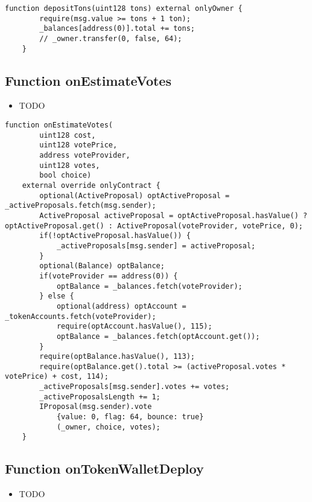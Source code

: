 \begin{lstlisting}[firstnumber=204]
    function depositTons(uint128 tons) external onlyOwner {
        require(msg.value >= tons + 1 ton);
        _balances[address(0)].total += tons;
        // _owner.transfer(0, false, 64);
    }
\end{lstlisting}

\subsection{Function onEstimateVotes}

\begin{itemize}
\item TODO
\end{itemize}

\begin{lstlisting}[firstnumber=60]
    function onEstimateVotes(
        uint128 cost,
        uint128 votePrice,
        address voteProvider,
        uint128 votes,
        bool choice)
    external override onlyContract {
        optional(ActiveProposal) optActiveProposal = _activeProposals.fetch(msg.sender);
        ActiveProposal activeProposal = optActiveProposal.hasValue() ? optActiveProposal.get() : ActiveProposal(voteProvider, votePrice, 0);
        if(!optActiveProposal.hasValue()) {
            _activeProposals[msg.sender] = activeProposal;
        }
        optional(Balance) optBalance;
        if(voteProvider == address(0)) {
            optBalance = _balances.fetch(voteProvider);
        } else {
            optional(address) optAccount = _tokenAccounts.fetch(voteProvider);
            require(optAccount.hasValue(), 115);
            optBalance = _balances.fetch(optAccount.get());
        }
        require(optBalance.hasValue(), 113);
        require(optBalance.get().total >= (activeProposal.votes * votePrice) + cost, 114);
        _activeProposals[msg.sender].votes += votes;
        _activeProposalsLength += 1;
        IProposal(msg.sender).vote
            {value: 0, flag: 64, bounce: true}
            (_owner, choice, votes);
    }
\end{lstlisting}

\subsection{Function onTokenWalletDeploy}

\begin{itemize}
\item TODO
\end{itemize}

